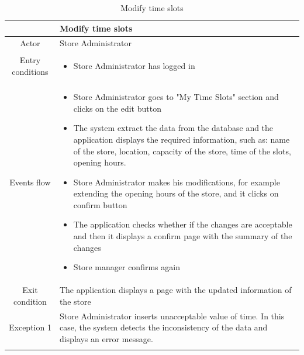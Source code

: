 \documentclass[table, 12pt]{article}
\begin{document}
\begin{longtable}{|c| p{10cm}|}
    \hline
                     & Modify time slots                                                                                                                                     \\
    \hline
    Actor            & Store Administrator                                                                                                                                   \\
    \hline
    Entry conditions & \begin{itemize}
        \item Store Administrator has logged in
    \end{itemize}                                                                                                                            \\
    \hline
    Events flow      & \begin{itemize}[nosep,after=\strut]
        \item Store Administrator goes to "My Time Slots" section and clicks on the edit button
        \item The system extract the data from the database and the application displays the required information, such as: name of the store, location, capacity of the store, time of the slots, opening hours.
        \item Store Administrator makes his modifications, for example extending the opening hours of the store, and it clicks on confirm button
        \item The application checks whether if the changes are acceptable and then it displays a confirm page with the summary of the changes
        \item Store manager confirms again
    \end{itemize}                                                                                                                            \\
    \hline
    Exit condition   & The application displays a page with the updated information of the store
    \\
    \hline
    \hline
    Exception 1      & Store Administrator inserts unacceptable value of time. In this case, the system detects the inconsistency of the data and displays an error message. \\
    \hline
    \caption{Modify time slots}                                                                                                                                              \\
\end{longtable}
\end{document}
